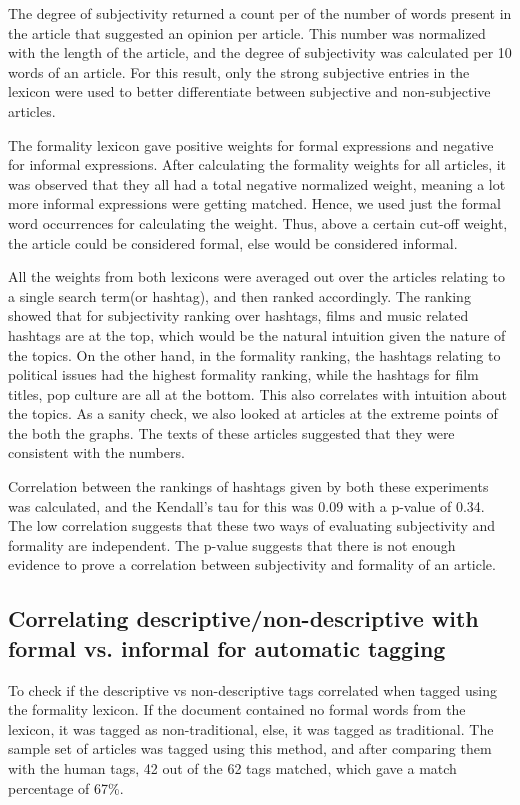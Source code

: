 \documentclass[11pt]{article}
\begin{document}
The degree of subjectivity returned a count per of the number of words present in the article that suggested an opinion per article. This number was normalized with the length of the article, and the degree of subjectivity was calculated per 10 words of an article. For this result, only the strong subjective entries in the lexicon were used to better differentiate between subjective and non-subjective articles.

The formality lexicon gave positive weights for formal expressions and negative for informal expressions. After calculating the formality weights for all articles, it was observed that they all had a total negative normalized weight, meaning a lot more informal expressions were getting matched. Hence, we used just the formal word occurrences for calculating the weight. Thus, above a certain cut-off weight, the article could be considered formal, else would be considered informal.

All the weights from both lexicons were averaged out over the articles relating to a single search term(or hashtag), and then ranked accordingly. The ranking showed that for subjectivity ranking over hashtags, films and music related hashtags are at the top, which would be the natural intuition given the nature of the topics. On the other hand, in the formality ranking, the hashtags relating to political issues had the highest formality ranking, while the hashtags for film titles, pop culture are all at the bottom. This also correlates with intuition about the topics. As a sanity check, we also looked at articles at the extreme points of the both the graphs. The texts of these articles suggested that they were consistent with the numbers.

Correlation between the rankings of hashtags given by both these experiments was calculated, and the Kendall’s tau for this was 0.09 with a p-value of 0.34. The low correlation suggests that these two ways of evaluating subjectivity and formality are independent. The p-value suggests that there is not enough evidence to prove a correlation between subjectivity and formality of an article.

\subsection{Correlating descriptive/non-descriptive with formal vs. informal for automatic tagging}

To check if the descriptive vs non-descriptive tags correlated when tagged using the formality lexicon. If the document contained no formal words from the lexicon, it was tagged as non-traditional, else, it was tagged as traditional. The sample set of articles was tagged using this method, and after comparing them with the human tags, 42 out of the 62 tags matched, which gave a match percentage of 67\%.
\end{document}
